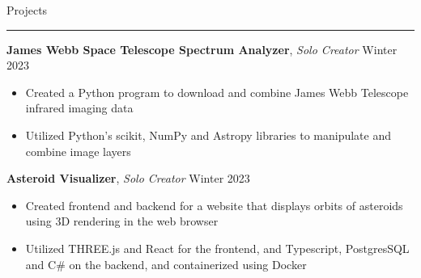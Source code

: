 \documentclass[11pt]{article}
\newcommand{\sectiontitle}[1]{
    \noindent\Large#1
    \newline
    \vspace{-0.18in}
    \hrule   
}
\newcommand{\occupation}[4]{
    \topitemspacing
    \normalsize
    \noindent\textbf{#1}
    \hfill
    \noindent#3
    \newline
    \noindent\textit{#2} | \textit{#4}
    \toplistspacing
}
\newcommand{\project}[3]{
    \topitemspacing
    \normalsize
    \noindent\textbf{#1}, \textit{#2}
    \hfill
    \noindent#3
    \toplistspacing
}
\newcommand{\sectionendspace}{
    \vspace{0.1in}
}
\newcommand{\toplistspacing}{
    \vspace{0.04in}
}
\newcommand{\topitemspacing}{
    \vspace{0.1in}
}
\begin{document}
    \sectionendspace
    \sectiontitle{Projects}
    \project{James Webb Space Telescope Spectrum Analyzer}{Solo Creator}{Winter 2023}
    \begin{itemize}[noitemsep,nolistsep]
        \item Created a Python program to download and combine James Webb Telescope infrared imaging data
        \item Utilized Python's scikit, NumPy and Astropy libraries to  manipulate and combine image layers
    \end{itemize}
    \project{Asteroid Visualizer}{Solo Creator}{Winter 2023}
    \begin{itemize}[noitemsep,nolistsep]
        \item Created frontend and backend for a website that displays orbits of asteroids using 3D rendering in the web browser
        \item Utilized THREE.js and React for the frontend, and Typescript, PostgresSQL and C\# on the backend, and containerized using Docker
    \end{itemize}
    \sectionendspace
\end{document}
